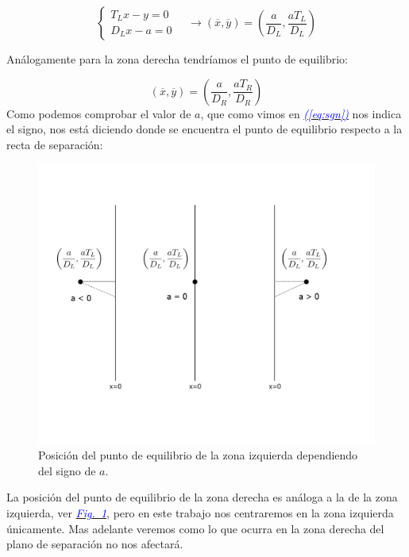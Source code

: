 \documentclass[12pt,a4paper]{report} %
\newcommand{\fref}[1]{\hyperref[#1]{\textcolor{blue}{\textit{Fig.~\ref*{#1}}}}}
\newcommand{\eref}[1]{\hyperref[#1]{\textcolor{blue}{\textit{(\ref*{#1})}}}}
\begin{document}
		\begin{equation}
			\label{eqpointL}
			\left\{
			\begin{aligned}
				T_Lx-y=0\\
				D_Lx-a=0
			\end{aligned}
			\right. \quad \longrightarrow \left( \overline{x},\overline{y} \right)=\left( \frac{a}{D_L},\frac{aT_L}{D_L} \right)
		\end{equation}\smallskip
		
		Análogamente para la zona derecha tendríamos el punto de equilibrio:
		
		\begin{equation}
			\label{eqpointR}
			\left( \overline{x},\overline{y} \right)=\left( \frac{a}{D_R},\frac{aT_R}{D_R} \right)
		\end{equation}\smallskip
		\newpage
		Como podemos comprobar el valor de $a$, que como vimos en \eref{eq:sgn} nos indica el signo, nos está diciendo donde se encuentra el punto de equilibrio respecto a la recta de separación:
		
		\begin{figure}[h]
			\centering
			\includegraphics[width=1\textwidth]{punto.jpg}
			\caption{Posición del punto de equilibrio de la zona izquierda dependiendo del signo de $a$.}
			\label{fig:punto}
		\end{figure}\smallskip
		
		La posición del punto de equilibrio de la zona derecha es análoga a la de la zona izquierda, ver \fref{fig:punto}, pero en este trabajo nos centraremos en la zona izquierda únicamente. Mas adelante veremos como lo que ocurra en la zona derecha del plano de separación no nos afectará.
		
\end{document}
